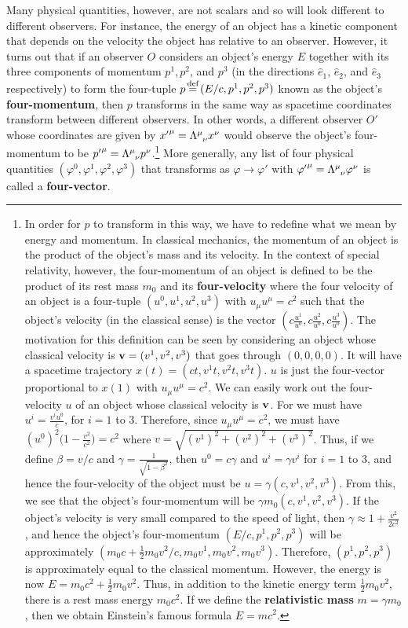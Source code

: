 Many physical quantities, however, are not scalars and so will look different to different observers. For instance, the energy of an object has a kinetic component that depends on the velocity the object has relative to an observer. However, it turns out that if an observer $O$ considers an object's energy $E$ together with its three components of momentum $p^1, p^2$, and $p^3$ (in the directions $\hat{e}_1$, $\hat{e}_2$, and $\hat{e}_3$ respectively) to form the four-tuple $p\myeq(E/c, p^1, p^2, p^3)$ known as the object's \textbf{four-momentum}, then $p$ transforms in the same way as spacetime coordinates transform between different observers. In other words, a different observer $O'$ whose coordinates are given by ${x'}^\mu=\Lambda\indices{^\mu_\nu}x^\nu$ would observe the object's four-momentum to be ${p'}^\mu=\Lambda\indices{^\mu_\nu}p^\nu$.\footnote{In order for $p$ to transform in this way, we have to redefine what we mean by energy and momentum. In classical mechanics, the momentum of an object is the product of the object's mass and its velocity. In the context of special relativity, however, the four-momentum of an object is defined to be the product of its rest mass $m_0$ and its \textbf{four-velocity} where the four velocity of an object is a four-tuple $(u^0, u^1, u^2, u^3)$ with $u_\mu u^\mu=c^2$ such that the object's velocity (in the classical sense) is the vector $(c \frac{u^1}{u^0}, c \frac{u^2}{u^0}, c\frac{u^3}{u^0})$. The motivation for this definition can be seen by considering an object whose classical velocity is $\vb{v}=(v^1,v^2,v^3)$ that goes through $(0,0,0,0)$. It will have a spacetime trajectory $x(t)=(ct, v^1 t, v^2 t, v^3 t)$. $u$ is just the four-vector proportional to $x(1)$ with $u_\mu u^\mu=c^2$.  We can easily work out the 
four-velocity $u$ of an object whose classical velocity is $\vb{v}$. For we must have $u^i=\frac{v^i u^0}{c}$, for $i=1$ to $3$. Therefore, since $u_\mu u^\mu=c^2$, we must have $(u^0)^2\big(1-\frac{v^2}{c^2}\big)=c^2$ where $v=\sqrt{({v}^1)^2+({v}^2)^2+({v}^3)^2}$. Thus, if we define $\beta={v}/{c}$ and $\gamma=\frac{1}{\sqrt{1-\beta^2}}$, then $u^0=c\gamma$ and $u^i=\gamma v^i$ for $i=1$ to $3$, and hence the four-velocity of the object must be $u=\gamma(c,v^1,v^2,v^3).$ From this, we see that the object's four-momentum will be $\gamma m_0(c,v^1,v^2,v^3).$ If the object's velocity is very small compared to the speed of light, then $\gamma\approx 1+\frac{v^2}{2c^2}$, and hence the object's four-momentum $(E/c, p^1, p^2, p^3)$ will be approximately $(m_0c+\frac{1}{2}m_0{v^2}/c, m_0v^1,m_0v^2,m_0v^3)$. Therefore, $(p^1, p^2, p^3)$ is approximately equal to the classical momentum. However, the energy is now $E=m_0c^2+\frac{1}{2}m_0{v^2}$. Thus, in addition to the kinetic energy term $\frac{1}{2}m_0{v^2}$, there is a rest mass energy $m_0c^2$. If we define the \textbf{relativistic mass} $m=\gamma m_0$, then we obtain Einstein's famous formula $E=mc^2$.  } More generally, any list of four physical quantities $(\varphi^0, \varphi^1, \varphi^2, \varphi^3)$ that transforms as $\varphi\rightarrow\varphi'$ with  ${\varphi'}^\mu=\Lambda\indices{^\mu_\nu}\varphi^\nu$ is called a \textbf{four-vector}.

